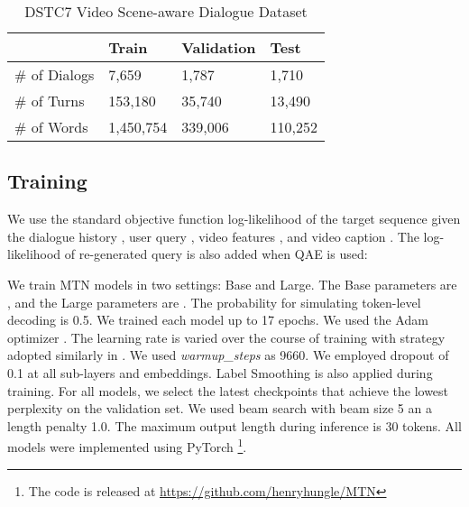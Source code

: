 \documentclass[11pt,a4paper]{article}
\begin{document}
\begin{table}[htbp]
	\centering
	\resizebox{1.0\columnwidth}{!} {
	\begin{tabular}{llll}
		\hline
		& \textbf{Train} & \textbf{Validation} & \textbf{Test}\\ \hline
		\# of Dialogs & 7,659                                 & 1,787                                   & 1,710	\\ \hline
		\# of Turns   & 153,180                               & 35,740                                  & 13,490   \\ \hline
		\# of Words   & 1,450,754                             & 339,006                                 & 110,252	\\ \hline
	\end{tabular}
	}
	\caption{DSTC7 Video Scene-aware Dialogue Dataset}
	\label{tab:datasets}
\end{table}



\subsection{Training}
We use the standard objective function log-likelihood of the target sequence  given the dialogue history , user query , video features , and video caption . The log-likelihood of re-generated query is also added when QAE is used: 

We train MTN models in two settings: Base and Large. The Base parameters are , and the Large parameters are . The probability  for simulating token-level decoding is 0.5. We trained each model up to 17 epochs. We used the Adam optimizer \cite{kingma2014adam}. The learning rate is varied over the course of training with strategy adopted similarly in \cite{vaswani17attention}. We used \textit{warmup\_steps} as 9660. We employed dropout \cite{srivastava2014dropout} of 0.1 at all sub-layers and embeddings. Label Smoothing \cite{szegedy2016rethinking} is also applied during training. For all models, we select the latest checkpoints that achieve the lowest perplexity on the validation set. We used beam search with beam size 5 an a length penalty 1.0. The maximum output length during inference is 30 tokens. All models were implemented using PyTorch \cite{paszke2017automatic} \footnote{The code is released at \url{https://github.com/henryhungle/MTN}}.
\end{document}
